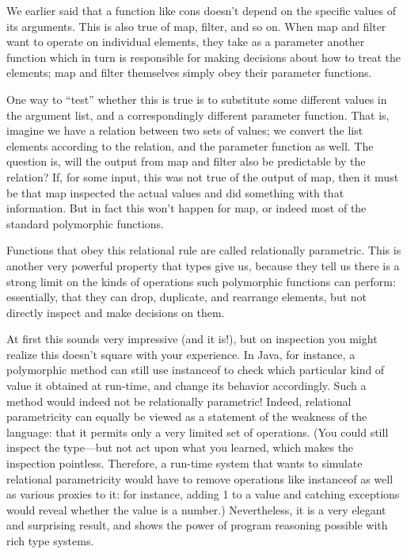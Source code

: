 We earlier said that a function like cons doesn’t depend on the specific values
of its arguments. This is also true of map, filter, and so on. When map and
filter want to operate on individual elements, they take as a parameter another
function which in turn is responsible for making decisions about how to treat
the elements; map and filter themselves simply obey their parameter functions.

One way to “test” whether this is true is to substitute some different values in
the argument list, and a correspondingly different parameter function. That is,
imagine we have a relation between two sets of values; we convert the list
elements according to the relation, and the parameter function as well. The
question is, will the output from map and filter also be predictable by the
relation? If, for some input, this was not true of the output of map, then it
must be that map inspected the actual values and did something with that
information. But in fact this won’t happen for map, or indeed most of the
standard polymorphic functions.

Functions that obey this relational rule are called relationally parametric.
This is another very powerful property that types give us, because they tell us
there is a strong limit on the kinds of operations such polymorphic functions
can perform: essentially, that they can drop, duplicate, and rearrange elements,
but not directly inspect and make decisions on them.

At first this sounds very impressive (and it is!), but on inspection you might
realize this doesn’t square with your experience. In Java, for instance, a
polymorphic method can still use instanceof to check which particular kind of
value it obtained at run-time, and change its behavior accordingly. Such a
method would indeed not be relationally parametric! Indeed, relational
parametricity can equally be viewed as a statement of the weakness of the
language: that it permits only a very limited set of operations.
(You could still inspect the type—but not act upon what you learned, which makes
the inspection pointless. Therefore, a run-time system that wants to simulate
relational parametricity would have to remove operations like instanceof as well
as various proxies to it: for instance, adding 1 to a value and catching
exceptions would reveal whether the value is a number.) Nevertheless, it is a
very elegant and surprising result, and shows the power of program reasoning
possible with rich type systems.

\secup
